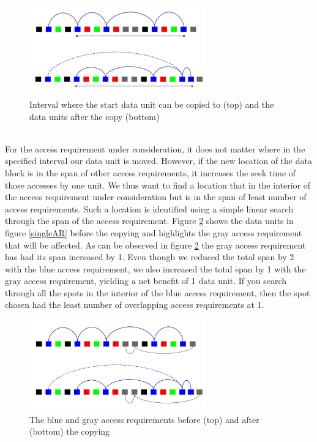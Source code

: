 \documentclass[conference]{acmsiggraph}
\begin{document}
\begin{figure}[ht]
\centering
\includegraphics[width=3in]{SingleAR_afterCopy.jpg}
\caption{Interval where the start data unit can be copied to (top) and the data units after the copy (bottom)}
\label{singleARafterCopy}
\end{figure}
\\
For the access requirement under consideration, it does not matter where in the specified interval our data unit is moved. However, if the new location of the data block is in the span of other access requirements, it increases the seek time of those accesses by one unit. We thus want to find a location that in the interior of the access requirement under consideration but is in the span of least number of access requirements. Such a location is identified using a simple linear search through the span of the access requirement. Figure \ref{singleARafterCopyOtherAR} shows the data units in figure \ref{singleAR} before the copying and highlights the gray access requirement that will be affected. As can be observed in figure \ref{singleARafterCopyOtherAR} the gray access requirement has had its span increased by 1. Even though we reduced the total span by 2 with the blue access requirement, we also increased the total span by 1 with the gray access requirement, yielding a net benefit of 1 data unit. If you search through all the spots in the interior of the blue access requirement, then the spot chosen had the least number of overlapping access requirements at 1.\\

\begin{figure}[ht]
\centering
\includegraphics[width=3in]{SingleAR_afterCopy_otherARnoted.jpg}
\caption{The blue and gray access requirements before (top) and after (bottom) the copying}
\label{singleARafterCopyOtherAR}
\end{figure}
\end{document}
